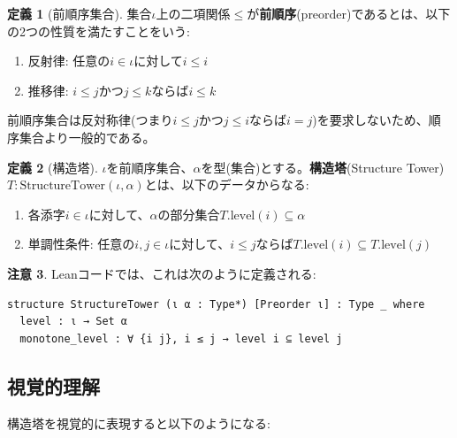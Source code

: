 \documentclass[a4paper,12pt]{article}
\theoremstyle{definition}
\newtheorem{definition}{定義}[section]
\newtheorem{remark}[definition]{注意}
\begin{document}
\begin{definition}[前順序集合]
集合$\iota$上の二項関係$\leq$が\textbf{前順序}(preorder)であるとは、以下の2つの性質を満たすことをいう:
\begin{enumerate}
\item 反射律: 任意の$i \in \iota$に対して$i \leq i$
\item 推移律: $i \leq j$かつ$j \leq k$ならば$i \leq k$
\end{enumerate}
前順序集合は反対称律(つまり$i \leq j$かつ$j \leq i$ならば$i = j$)を要求しないため、順序集合より一般的である。
\end{definition}

\begin{definition}[構造塔]\label{def:tower}
$\iota$を前順序集合、$\alpha$を型(集合)とする。\textbf{構造塔}(Structure Tower)$T : \text{StructureTower}(\iota, \alpha)$とは、以下のデータからなる:
\begin{enumerate}
\item 各添字$i \in \iota$に対して、$\alpha$の部分集合$T.\text{level}(i) \subseteq \alpha$
\item 単調性条件: 任意の$i, j \in \iota$に対して、$i \leq j$ならば$T.\text{level}(i) \subseteq T.\text{level}(j)$
\end{enumerate}
\end{definition}

\begin{remark}
Leanコードでは、これは次のように定義される:
\begin{verbatim}
structure StructureTower (ι α : Type*) [Preorder ι] : Type _ where
  level : ι → Set α
  monotone_level : ∀ {i j}, i ≤ j → level i ⊆ level j
\end{verbatim}
\end{remark}

\subsection{視覚的理解}

構造塔を視覚的に表現すると以下のようになる:
\end{document}
